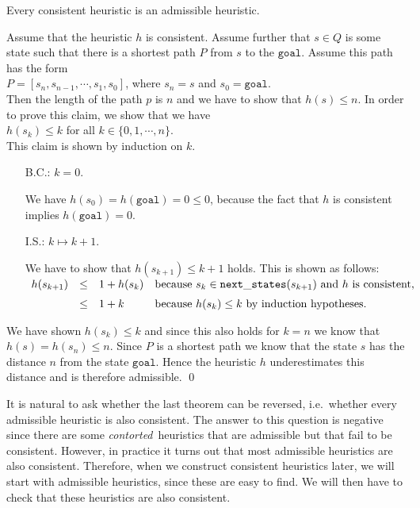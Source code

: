 \begin{Theorem}
  Every consistent heuristic is an admissible heuristic.
\end{Theorem}

\proof
Assume that the heuristic $h$ is consistent.  Assume further that $s \in Q$ is some state such that there is a
shortest path $P$ from $s$ to the $\texttt{goal}$.  Assume this path has the form
\\[0.2cm]
\hspace*{1.3cm}
$P = [s_n, s_{n-1}, \cdots, s_1, s_0]$, \quad where $s_n = s$ and $s_0 = \mathtt{goal}$.
\\[0.2cm]
Then the length of the path $p$ is $n$ and we have to show that $h(s) \leq n$.  In order to prove this claim, we show
that we have
\\[0.2cm]
\hspace*{1.3cm}
$h(s_k) \leq k$ \quad for all $k \in \{0, 1, \cdots, n\}$.
\\[0.2cm]
This claim is shown by induction on $k$.
\begin{enumerate}
\item[B.C.:] $k=0$.

             We have $h(s_0) = h(\mathtt{goal}) = 0 \leq 0$, because the fact that $h$ is consistent implies
             $h(\mathtt{goal}) = 0$.
\item[I.S.:] $k \mapsto k+1$.

             We have to show that $h(s_{k+1}) \leq k + 1$ holds.  This is shown as follows:
             \\[0.2cm]
             \hspace*{1.3cm}
             $
             \begin{array}[b]{lcll}
               h(s_{k+1}) & \leq & 1 + h(s_k) & \mbox{because $s_k \in \mathtt{next\_states}(s_{k+1})$ and $h$ is consistent,} \\[0.2cm]
                         & \leq & 1 + k      & \mbox{because $h(s_k) \leq k$ by induction hypotheses.} 
             \end{array}
             $ 
\end{enumerate}
We have shown $h(s_k) \leq k$ and since this also holds for $k = n$ we know that $h(s) = h(s_n) \leq n$.  Since $P$
is a shortest path we know that the state $s$ has the distance $n$ from the state $\texttt{goal}$.  Hence the
heuristic $h$ underestimates this distance and is therefore admissible.
\qed

It is natural to ask whether the last theorem can be reversed, i.e.~whether every admissible heuristic is also
consistent.  The answer to this question is negative since there are
some \emph{\color{red}contorted}\, heuristics that are admissible but that fail to be consistent.  However, in
practice it turns out that most 
admissible heuristics are also consistent.  Therefore, when we construct consistent heuristics later, we will
start with admissible heuristics, since these are easy to find.  We will then have to check that these
heuristics are also consistent.

